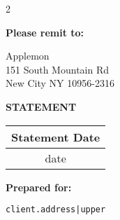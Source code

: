 \documentclass[american,letterpaper,10pt]{article}
\begin{document}
\begin{multicols}{2}
\textbf{Please remit to:}
\smallskip

Applemon\\
151 South Mountain Rd\\
New City NY 10956-2316
\begin{flushright}
\textbf{\huge STATEMENT}
\smallskip

\begin{tabular}{c}
\textbf{Statement Date} \\
\midrule \midrule
{{ date }} \\
\end{tabular}
\end{flushright}
\end{multicols}

\bigskip

\textbf{Prepared for:} \medskip

\bigskip

\qquad \begin{minipage}[t]{5in}
\small \begin{alltt}
{{ client.address|upper }}
\end{alltt}
\end{minipage}

\bigskip
\end{document}
